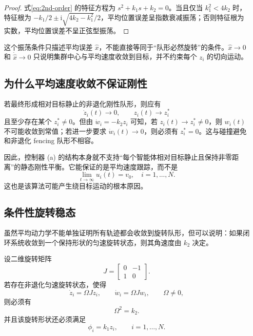 \begin{proof}
式\eqref{eq:2nd-order} 的特征方程为 $s^2+k_1s+k_2=0$。当且仅当 $k_1^2<4k_2$ 时，特征根为 $-k_1/2\pm \mathrm{i}\sqrt{4k_2-k_1^2}/2$，平均位置误差呈指数衰减振荡；否则特征根为实数，平均位置误差不呈正弦型振荡。
\end{proof}

\begin{remark}
这个振荡条件只描述平均误差 $\hat{x}$，不能直接等同于“队形必然旋转”的条件。$\hat{x}\to0$ 和 $\dot{\hat{x}}\to0$ 只说明集群中心与平均速度收敛到目标，并不约束每个 $z_i$ 的切向运动。
\end{remark}

\subsection{为什么平均速度收敛不保证刚性}

若最终形成相对目标静止的非退化刚性队形，则应有
\begin{equation}
\dot{z}_i(t)\to0,\qquad z_i(t)\to z_i^\ast
\end{equation}
且至少存在某个 $z_i^\ast\neq0$。但由 $\dot{w}_i=-k_2z_i$ 可知，若 $z_i(t)\to z_i^\ast\neq0$，则 $w_i(t)$ 不可能收敛到常值；若进一步要求 $\dot{w}_i(t)\to0$，则必须有 $z_i^\ast=0$。这与碰撞避免和非退化 fencing 队形不相容。

因此，控制器 (a) 的结构本身就不支持“每个智能体相对目标静止且保持非零距离”的静态刚性平衡。它能保证的是平均速度跟踪，而不是
\begin{equation}
\lim_{t\to\infty}u_i(t)=v_0,\quad i=1,\ldots,N .
\end{equation}
这也是该算法可能产生绕目标运动的根本原因。

\subsection{条件性旋转稳态}

虽然平均动力学不能单独证明所有轨迹都会收敛到旋转队形，但可以说明：如果闭环系统收敛到一个保持形状的匀速旋转状态，则其角速度由 $k_2$ 决定。

\begin{theorem}[匀速旋转稳态的必要条件]
设二维旋转矩阵
\begin{equation}
J=\begin{bmatrix}0&-1\\1&0\end{bmatrix}.
\end{equation}
若存在非退化匀速旋转状态，使得
\begin{equation}
\dot{z}_i=\Omega Jz_i,\qquad \dot{w}_i=\Omega Jw_i,\qquad \Omega\neq0,
\end{equation}
则必须有
\begin{equation}
\Omega^2=k_2. \label{eq:kou-omega-necessary}
\end{equation}
并且该旋转形状还必须满足
\begin{equation}
\phi_i=k_1z_i,\qquad i=1,\ldots,N . \label{eq:kou-shape-balance}
\end{equation}
\end{theorem}

